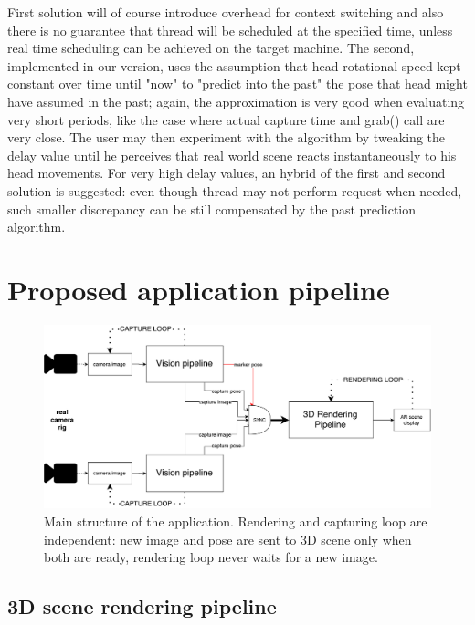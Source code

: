 First solution will of course introduce overhead for context switching and also there is no guarantee that thread will be scheduled at the specified time, unless real time scheduling can be achieved on the target machine. The second, implemented in our version, uses the assumption that head rotational speed kept constant over time until "now" to "predict into the past" the pose that head might have assumed in the past; again, the approximation is very good when evaluating very short periods, like the case where actual capture time and grab() call are very close. The user may then experiment with the algorithm by tweaking the delay value until he perceives that real world scene reacts instantaneously to his head movements. For very high delay values, an hybrid of the first and second solution is suggested: even though thread may not perform request when needed, such smaller discrepancy can be still compensated by the past prediction algorithm.

\newpage

\section{Proposed application pipeline}

\begin{figure}[h!]
\centering
\includegraphics[width=\linewidth]{schemas/application-schema}
\caption{Main structure of the application. Rendering and capturing loop are independent: new image and pose are sent to 3D scene only when both are ready, rendering loop never waits for a new image.}
\label{fig:app_architecture}
\end{figure}

\subsection{3D scene rendering pipeline}

